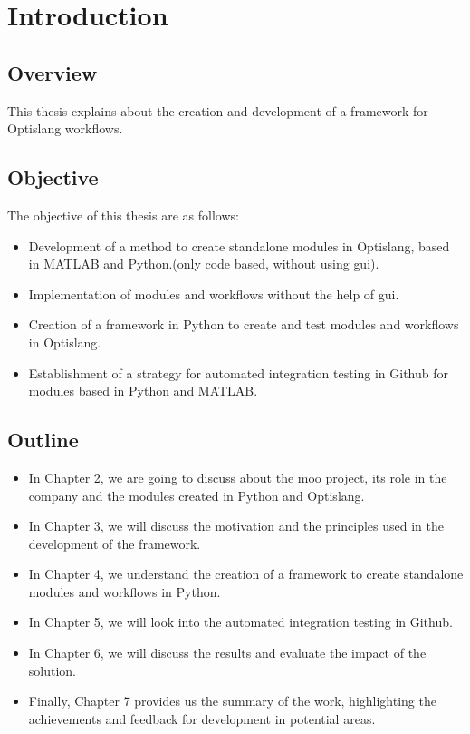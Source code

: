 \chapter{Introduction}
\section{Overview}
This thesis explains about the creation and development of a framework for Optislang workflows.


\section{Objective}
The objective of this thesis are as follows:
\begin{itemize}
    \item Development of a method to create standalone modules in Optislang, based in MATLAB and Python.(only code based, without using 
    \acrshort{gui}).
    \item Implementation of modules and workflows without the help of \acrshort{gui}.
    \item Creation of a framework in Python to create and test modules and workflows in Optislang.
    \item Establishment of a strategy for automated integration testing in Github for modules based in Python and MATLAB. 
\end{itemize}

\section{Outline}
\begin{itemize}
    \item   In Chapter 2, we are going to discuss about the \acrshort{moo} project, its role in the company and the modules created in Python and Optislang.
    \item   In Chapter 3, we will discuss the motivation and the principles used in the development of the framework. 
    \item   In Chapter 4, we understand the creation of a framework to create standalone modules and workflows in Python.
    \item   In Chapter 5, we will look into the automated integration testing in Github.
    \item   In Chapter 6, we will discuss the results and evaluate the impact of the solution.
    \item   Finally, Chapter 7 provides us the summary of the work, highlighting the achievements and feedback for development in potential areas.
\end{itemize}